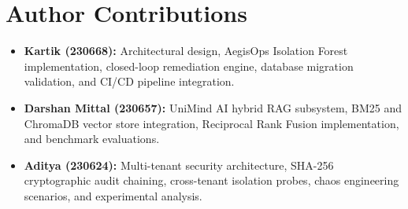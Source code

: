 \documentclass[12pt,onecolumn,draftclsnofoot]{IEEEtran}
\begin{document}
\section*{Author Contributions}
\begin{itemize}
    \item \textbf{Kartik (230668):} Architectural design, AegisOps Isolation Forest implementation, closed-loop remediation engine, database migration validation, and CI/CD pipeline integration.
    \item \textbf{Darshan Mittal (230657):} UniMind AI hybrid RAG subsystem, BM25 and ChromaDB vector store integration, Reciprocal Rank Fusion implementation, and benchmark evaluations.
    \item \textbf{Aditya (230624):} Multi-tenant security architecture, SHA-256 cryptographic audit chaining, cross-tenant isolation probes, chaos engineering scenarios, and experimental analysis.
\end{itemize}



\end{document}
